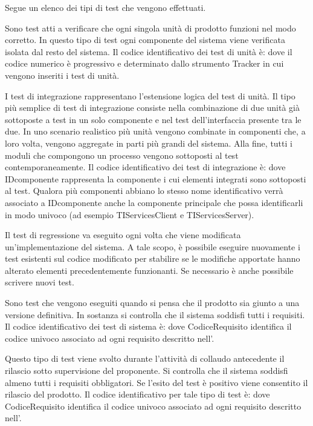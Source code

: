 \documentclass[a4paper, titlepage]{article}
\begin{document}
\label{sez:test}
Segue un elenco dei tipi di test che vengono effettuati.

Sono test atti a verificare che ogni singola unità di prodotto funzioni nel modo corretto. In questo tipo di test ogni componente del sistema viene verificata isolata dal resto del sistema.
Il codice identificativo dei test di unità è:  dove il codice numerico è progressivo e determinato dallo strumento Tracker in cui vengono inseriti i test di unità.

I test di integrazione rappresentano l'estensione logica del test di unità. Il tipo più semplice di test di integrazione consiste nella combinazione di due unità già sottoposte a test in un solo componente e nel test dell'interfaccia presente tra le due. In uno scenario realistico più unità vengono combinate in componenti che, a loro volta, vengono aggregate in parti più grandi del sistema. Alla fine, tutti i moduli che compongono un processo vengono sottoposti al test contemporaneamente.
Il codice identificativo dei test di integrazione è:  dove IDcomponente rappresenta la componente i cui elementi integrati sono sottoposti al test. Qualora più componenti abbiano lo stesso nome identificativo verrà associato a IDcomponente anche la componente principale che possa identificarli in modo univoco (ad esempio TIServicesClient e TIServicesServer).

Il test di regressione va eseguito ogni volta che viene modificata un'implementazione del sistema. A tale scopo, è possibile eseguire nuovamente i test esistenti sul codice modificato per stabilire se le modifiche apportate hanno alterato elementi precedentemente funzionanti. Se necessario è anche possibile scrivere nuovi test.

Sono test che vengono eseguiti quando si pensa che il prodotto sia giunto a una versione definitiva. In sostanza si controlla che il sistema soddisfi tutti i requisiti.
Il codice identificativo dei test di sistema è:  dove CodiceRequisito identifica il codice univoco associato ad ogni requisito descritto nell'.

Questo tipo di test viene svolto durante l'attività di collaudo antecedente il rilascio sotto supervisione del proponente. Si controlla che il sistema soddisfi almeno tutti i requisiti obbligatori. Se l'esito del test è positivo viene consentito il rilascio del prodotto.
Il codice identificativo per tale tipo di test è:  dove CodiceRequisito identifica il codice univoco associato ad ogni requisito descritto nell'.
\end{document}
